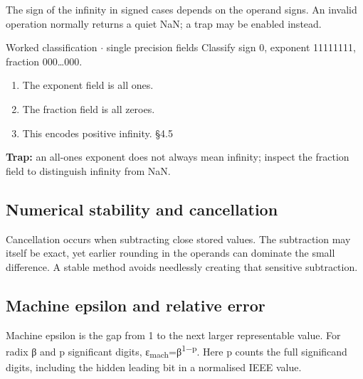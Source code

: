 \documentclass[11pt]{article}
\begin{document}
\begin{keepsection}
\begin{keepsection}
The sign of the infinity in signed cases depends on the operand signs. An invalid operation normally returns a quiet NaN; a trap may be enabled instead.

\begin{workedbox}{Worked classification \ensuremath{\cdot} single precision fields}
Classify sign 0, exponent 11111111, fraction 000…000.

\begin{enumerate}
\item The exponent field is all ones.
\item The fraction field is all zeroes.
\item This encodes positive infinity. \hfill{\small\color{FAUblue}§4.5}
\end{enumerate}
\end{workedbox}

\begin{notebox}\textbf{Trap:} an all-ones exponent does not always mean infinity; inspect the fraction field to distinguish infinity from NaN.\end{notebox}
\end{keepsection}

\begin{keepsection}
\subsection{Numerical stability and cancellation}

Cancellation occurs when subtracting close stored values. The subtraction may itself be exact, yet earlier rounding in the operands can dominate the small difference. A stable method avoids needlessly creating that sensitive subtraction.
\end{keepsection}

\begin{keepsection}
\subsection{Machine epsilon and relative error}

Machine epsilon is the gap from 1 to the next larger representable value. For radix β and p significant digits, ε\textsubscript{mach}=β\textsuperscript{1\ensuremath{-}p}. Here p counts the full significand digits, including the hidden leading bit in a normalised IEEE value.


\end{keepsection}
\end{keepsection}
\end{document}
